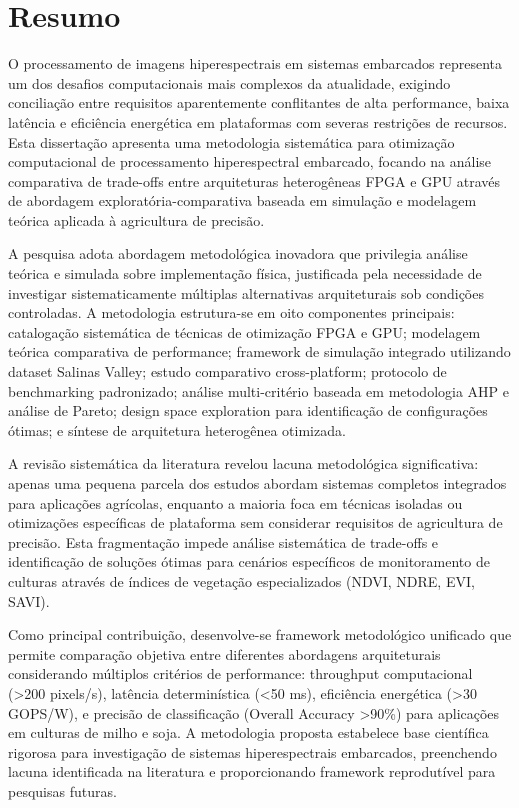 
\chapter*{Resumo}

O processamento de imagens hiperespectrais em sistemas embarcados representa um dos desafios computacionais mais complexos da atualidade, exigindo conciliação entre requisitos aparentemente conflitantes de alta performance, baixa latência e eficiência energética em plataformas com severas restrições de recursos. Esta dissertação apresenta uma metodologia sistemática para otimização computacional de processamento hiperespectral embarcado, focando na análise comparativa de trade-offs entre arquiteturas heterogêneas FPGA e GPU através de abordagem exploratória-comparativa baseada em simulação e modelagem teórica aplicada à agricultura de precisão.

A pesquisa adota abordagem metodológica inovadora que privilegia análise teórica e simulada sobre implementação física, justificada pela necessidade de investigar sistematicamente múltiplas alternativas arquiteturais sob condições controladas. A metodologia estrutura-se em oito componentes principais: catalogação sistemática de técnicas de otimização FPGA e GPU; modelagem teórica comparativa de performance; framework de simulação integrado utilizando dataset Salinas Valley; estudo comparativo cross-platform; protocolo de benchmarking padronizado; análise multi-critério baseada em metodologia AHP e análise de Pareto; design space exploration para identificação de configurações ótimas; e síntese de arquitetura heterogênea otimizada.

A revisão sistemática da literatura revelou lacuna metodológica significativa: apenas uma pequena parcela dos estudos abordam sistemas completos integrados para aplicações agrícolas, enquanto a maioria foca em técnicas isoladas ou otimizações específicas de plataforma sem considerar requisitos de agricultura de precisão. Esta fragmentação impede análise sistemática de trade-offs e identificação de soluções ótimas para cenários específicos de monitoramento de culturas através de índices de vegetação especializados (NDVI, NDRE, EVI, SAVI).

Como principal contribuição, desenvolve-se framework metodológico unificado que permite comparação objetiva entre diferentes abordagens arquiteturais considerando múltiplos critérios de performance: throughput computacional (>200 pixels/s), latência determinística (<50 ms), eficiência energética (>30 GOPS/W), e precisão de classificação (Overall Accuracy >90\%) para aplicações em culturas de milho e soja. A metodologia proposta estabelece base científica rigorosa para investigação de sistemas hiperespectrais embarcados, preenchendo lacuna identificada na literatura e proporcionando framework reprodutível para pesquisas futuras.

